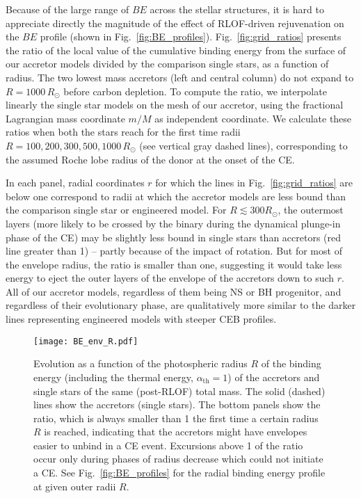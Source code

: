 \documentclass[twocolumn,twocolappendix,trackchanges]{aastex63}
\DeclareRobustCommand{\Figref}[1]{Fig.~\ref{#1}}
\begin{document}
Because of the large range of $BE$ across the stellar structures, it
is hard to appreciate directly the magnitude of the effect of RLOF-driven
rejuvenation on the $BE$ profile (shown in \Figref{fig:BE_profiles}). \Figref{fig:grid_ratios} presents the
ratio of the local value of the cumulative binding energy from the
surface of our accretor models divided by the
comparison single stars, as a function of radius. The two
lowest mass accretors (left and central column) do not expand to
$R=1000\, R_\odot$ before carbon depletion. To compute the
ratio, we interpolate linearly the single star models on the mesh of
our accretor, using the fractional Lagrangian mass coordinate $m/M$ as
independent coordinate.
We calculate these ratios
when both the stars reach for the first time radii
$R=100, 200, 300, 500, 1000\,R_\odot$ (see vertical gray dashed
lines), corresponding to the assumed Roche lobe radius of the donor at
the onset of the CE.

In each panel, radial coordinates $r$ for which the lines in
\Figref{fig:grid_ratios} are below one correspond to radii at which
the accretor models are less bound than the comparison single star or
engineered model. For $R\lesssim 300R_\odot$, the outermost layers
(more likely to be crossed by the binary during the dynamical
plunge-in phase of the CE) may be slightly less bound in single stars
than accretors (red line greater than 1) -- partly because of
the impact of rotation. But for most of the envelope
radius, the ratio is smaller than one, suggesting it would take less
energy to eject the outer layers of the envelope of the accretors down
to such $r$. All of our accretor models, regardless of them being NS
or BH progenitor, and regardless of their evolutionary phase,
are qualitatively more similar to the darker lines
representing engineered models with steeper CEB profiles.


\begin{figure}[htbp]
  \centering
  \texttt{[image: BE\_env\_R.pdf]}
  \caption{Evolution as a function of the photospheric radius $R$ of
    the binding energy (including the thermal energy,
    $\alpha_\mathrm{th}=1$) of the accretors and single stars of the
    same (post-RLOF) total mass. The solid (dashed) lines show the
    accretors (single stars). The bottom panels show the ratio, which
    is always smaller than 1 the first time a certain radius $R$ is
    reached, indicating that the accretors might have envelopes easier
    to unbind in a CE event. Excursions
      above 1 of the ratio occur only during phases of radius decrease
      which could not initiate a CE. See \Figref{fig:BE_profiles} for
    the radial binding energy profile at given outer radii $R$.}
  \label{fig:BE_env_R}
\end{figure}
\end{document}

